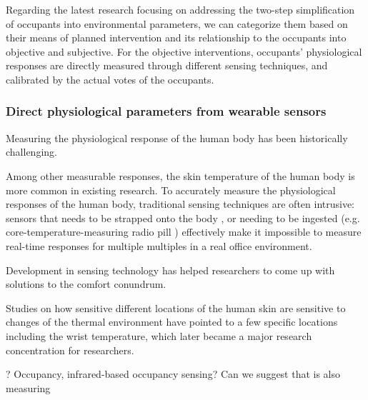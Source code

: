 Regarding the latest research focusing on addressing the two-step simplification of occupants into environmental parameters, we can categorize them based on their means of planned intervention and its relationship to the occupants into objective and subjective. For the objective interventions, occupants' physiological responses are directly measured through different sensing techniques, and calibrated by the actual votes of the occupants. 

\subsubsection{Direct physiological parameters from wearable sensors}
Measuring the physiological response of the human body has been historically challenging. 

Among other measurable responses, the skin temperature of the human body is more common in existing research. To accurately measure the physiological responses of the human body, traditional sensing techniques are often intrusive: sensors that needs to be strapped onto the body \cite{mccarthy_validation_2016}, or needing to be ingested (e.g. core-temperature-measuring radio pill \cite{}) effectively make it impossible to measure real-time responses for multiple multiples in a real office environment. 

Development in sensing technology has helped researchers to come up with solutions to the comfort conundrum. 

Studies on how sensitive different locations of the human skin are sensitive to changes of the thermal environment have pointed to a few specific locations including the wrist temperature, which later became a major research concentration for researchers\cite{choi_cobi:_2010}. 





? Occupancy, infrared-based occupancy sensing? Can we suggest that is also measuring 
